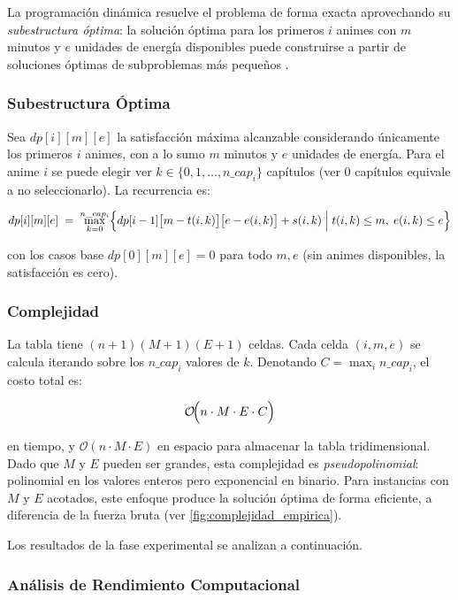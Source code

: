 \vspace{1cm}
La programación dinámica resuelve el problema de forma exacta
aprovechando su \emph{subestructura óptima}: la solución óptima para los
primeros $i$ animes con $m$ minutos y $e$ unidades de energía disponibles
puede construirse a partir de soluciones óptimas de subproblemas más pequeños \parencite{gfg_01_knapsack} \parencite{roughgarden_algorithms}.

\subsubsection*{Subestructura Óptima}
Sea $dp[i][m][e]$ la satisfacción máxima alcanzable considerando únicamente
los primeros $i$ animes, con a lo sumo $m$ minutos y $e$ unidades de energía.
Para el anime $i$ se puede elegir ver $k \in \{0, 1, \ldots, n\_cap_i\}$
capítulos (ver $0$ capítulos equivale a no seleccionarlo).  La recurrencia es:

\[
    dp[i][m][e] \;=\; \max_{k=0}^{n\_cap_i}
    \Bigl\{
        dp[i-1]\bigl[m - t(i,k)\bigr]\bigl[e - e(i,k)\bigr]
        + s(i,k)
        \;\Big|\;
        t(i,k) \leq m,\; e(i,k) \leq e
    \Bigr\}
\]

con los casos base $dp[0][m][e] = 0$ para todo $m, e$ (sin animes disponibles,
la satisfacción es cero).

\subsubsection*{Complejidad}
La tabla tiene $(n+1)(M+1)(E+1)$ celdas.  Cada celda $(i,m,e)$ se calcula
iterando sobre los $n\_cap_i$ valores de $k$.  Denotando
$C = \max_i n\_cap_i$, el costo total es:

\[
    \mathcal{O}\!\Bigl(n \cdot M \cdot E \cdot C\Bigr)
\]

en tiempo, y $\mathcal{O}(n \cdot M \cdot E)$ en espacio para almacenar la
tabla tridimensional.  Dado que $M$ y $E$ pueden ser grandes, esta complejidad
es \emph{pseudopolinomial}: polinomial en los valores enteros pero exponencial en binario. Para instancias con $M$ y $E$ acotados, este enfoque produce la solución óptima de forma eficiente, a diferencia de la fuerza bruta (ver \cref{fig:complejidad_empirica}).

\vspace{1cm}
Los resultados de la fase experimental se analizan a continuación.

\subsubsection*{Análisis de Rendimiento Computacional}

